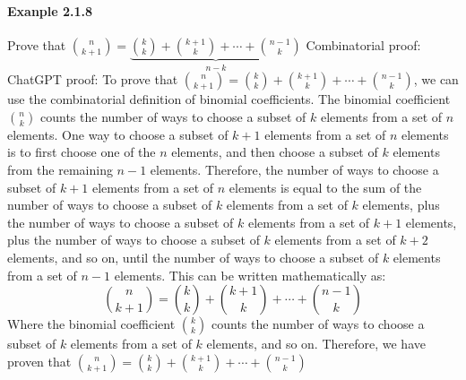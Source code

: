 \documentclass{article}
\begin{document}
\paragraph{Exanple 2.1.8}
Prove that $\binom{n}{k+1}=\underbrace{\binom{k}{k}+\binom{k+1}{k}+\cdots + \binom{n-1}{k}}_{n-k}$\newline
Combinatorial proof:\newline
ChatGPT proof:\newline
To prove that $\binom{n}{k+1} = \binom{k}{k} + \binom{k+1}{k} + \cdots + \binom{n-1}{k}$, we can use the combinatorial definition of binomial coefficients.\newline
The binomial coefficient $\binom{n}{k}$ counts the number of ways to choose a subset of $k$ elements from a set of $n$ elements.\newline
One way to choose a subset of $k+1$ elements from a set of $n$ elements is to first choose one of the $n$ elements, and then choose a subset of $k$ elements from the remaining $n-1$ elements.\newline
Therefore, the number of ways to choose a subset of $k+1$ elements from a set of $n$ elements is equal to the sum of the number of ways to choose a subset of $k$ elements from a set of $k$ elements, plus the number of ways to choose a subset of $k$ elements from a set of $k+1$ elements, plus the number of ways to choose a subset of $k$ elements from a set of $k+2$ elements, and so on, until the number of ways to choose a subset of $k$ elements from a set of $n-1$ elements.\newline
This can be written mathematically as:
$$\binom{n}{k+1} = \binom{k}{k} + \binom{k+1}{k} + \cdots + \binom{n-1}{k}$$
Where the binomial coefficient $\binom{k}{k}$ counts the number of ways to choose a subset of $k$ elements from a set of $k$ elements, and so on.\newline
Therefore, we have proven that $\binom{n}{k+1} = \binom{k}{k} + \binom{k+1}{k} + \cdots + \binom{n-1}{k}$
\end{document}
